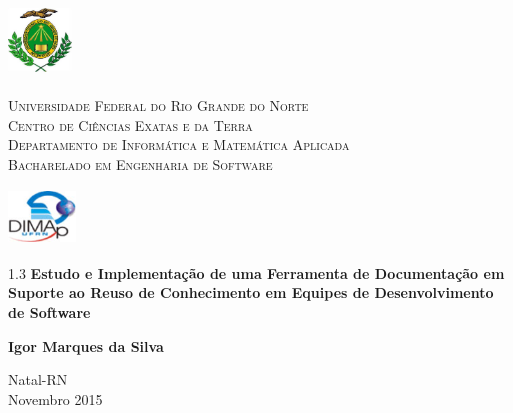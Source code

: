 
\begin{titlepage}
	\begin{center}

		\begin{minipage}{2cm}
			\begin{center}
				\includegraphics[width=1.7cm, height=2.0cm]{Imagens/Brasao-UFRN.jpg}
			\end{center}
		\end{minipage}
		\begin{minipage}{11cm}
			\begin{center}
				\begin{espacosimples}
					{\small \textsc{Universidade Federal do Rio Grande do Norte}			\\
							  \textsc{Centro de Ciências Exatas e da Terra}						\\
							  \textsc{Departamento de Informática e Matemática Aplicada}	\\
							  \textsc{Bacharelado em Engenharia de Software}}
				\end{espacosimples}
			\end{center}
		\end{minipage}
		\begin{minipage}{2cm}
			\begin{center}
				\includegraphics[width=1.8cm, height=1.5cm]{Imagens/Logotipo-DIMAp.jpg}
			\end{center}
		\end{minipage}

		\vspace{5cm}

		{\setlength{\baselineskip}%
		{1.3\baselineskip}
		{\LARGE \textbf{Estudo e Implementação de uma Ferramenta de Documentação em Suporte ao Reuso de Conhecimento em Equipes de Desenvolvimento de Software}}\par}

		\vspace{4cm}

		{\large \textbf{Igor Marques da Silva}}

		\vspace{7cm}

		Natal-RN\\Novembro 2015
	\end{center}
\end{titlepage}